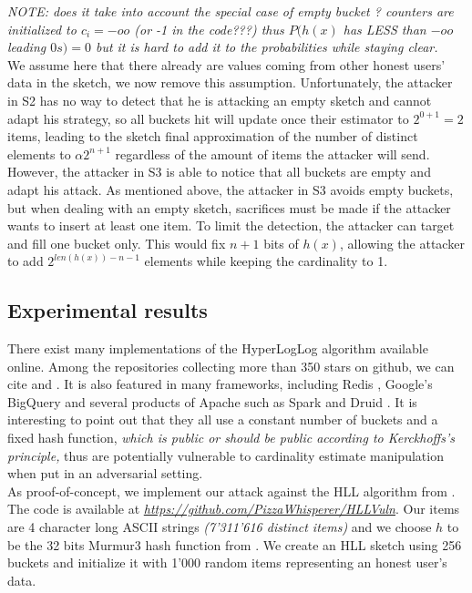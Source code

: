 \documentclass{IEEEtran}
\begin{document}
\textit{NOTE: does it take into account the special case of empty bucket ? counters are initialized to $c_i=-oo$ (or -1 in the code???) thus $P(h(x)$ has LESS than $-oo$ leading $0s) = 0$ but it is hard to add it to the probabilities while staying clear.}\\

We assume here that there already are values coming from other honest users' data in the sketch, we now remove this assumption. Unfortunately, the attacker in S2 has no way to detect that he is attacking an empty sketch and cannot adapt his strategy, so all buckets hit will update once their estimator to $2^{0+1}=2$ items, leading to the sketch final approximation of the number of distinct elements to $\alpha2^{n+1}$ regardless of the amount of items the attacker will send. However, the attacker in S3 is able to notice that all buckets are empty and adapt his attack. As mentioned above, the attacker in S3 avoids empty buckets, but when dealing with an empty sketch, sacrifices must be made if the attacker wants to insert at least one item. To limit the detection, the attacker can target and fill one bucket only. This would fix $n+1$ bits of $h(x)$, allowing the attacker to add $2^{len(h(x))-n-1}$ elements while keeping the cardinality to 1.

\subsection{Experimental results}
There exist many implementations of the HyperLogLog algorithm available online. Among the repositories collecting more than 350 stars on github, we can cite \cite{clahll} and \cite{datasketch}. It is also featured in many frameworks, including Redis \cite{redis}, Google's BigQuery \cite{bigquery} and several products of Apache such as Spark \cite{spahll} \cite{spahll2} and Druid \cite{druhll}. It is interesting to point out that they all use a constant number of buckets and a fixed hash function, \textit{which is public or should be public according to Kerckhoffs's principle,} thus are potentially vulnerable to cardinality estimate manipulation when put in an adversarial setting.\\

As proof-of-concept, we implement our attack against the HLL algorithm from \cite{clahll}. The code is available at \href{https://github.com/PizzaWhisperer/HLLVuln}{\textit{\url{https://github.com/PizzaWhisperer/HLLVuln}}}. Our items are 4 character long ASCII strings \textit{(7'311'616 distinct items)} and we choose $h$ to be the 32 bits Murmur3 hash function from \cite{murmur3code}. We create an HLL sketch using 256 buckets and initialize it with 1'000 random items representing an honest user's data.
\end{document}
